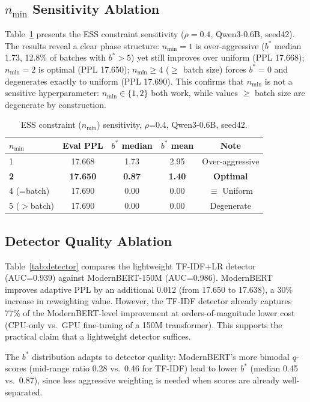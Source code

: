 \documentclass[11pt]{article}
\begin{document}
\subsection{$n_{\min}$ Sensitivity Ablation}
\label{sec:nmin_ablation}

Table~\ref{tab:nmin} presents the ESS constraint sensitivity ($\rho=0.4$, Qwen3-0.6B, seed42). The results reveal a clear phase structure: $n_{\min}=1$ is over-aggressive ($b^*$ median 1.73, 12.8\% of batches with $b^*>5$) yet still improves over uniform (PPL 17.668); $n_{\min}=2$ is optimal (PPL 17.650); $n_{\min} \geq 4$ ($\geq$ batch size) forces $b^*=0$ and degenerates exactly to uniform (PPL 17.690). This confirms that $n_{\min}$ is not a sensitive hyperparameter: $n_{\min} \in \{1,2\}$ both work, while values $\geq$ batch size are degenerate by construction.

\begin{table}[t]
\centering
\caption{ESS constraint ($n_{\min}$) sensitivity, $\rho$=0.4, Qwen3-0.6B, seed42.}
\label{tab:nmin}
\small
\begin{tabular}{l cccc}
\toprule
$n_{\min}$ & Eval PPL & $b^*$ median & $b^*$ mean & Note \\
\midrule
1 & 17.668 & 1.73 & 2.95 & Over-aggressive \\
\textbf{2} & \textbf{17.650} & \textbf{0.87} & \textbf{1.40} & \textbf{Optimal} \\
4 (=batch) & 17.690 & 0.00 & 0.00 & $\equiv$ Uniform \\
5 ($>$batch) & 17.690 & 0.00 & 0.00 & Degenerate \\
\bottomrule
\end{tabular}
\end{table}

\subsection{Detector Quality Ablation}
\label{sec:detector}

Table~\ref{tab:detector} compares the lightweight TF-IDF+LR detector (AUC=0.939) against ModernBERT-150M (AUC=0.986). ModernBERT improves adaptive PPL by an additional 0.012 (from 17.650 to 17.638), a 30\% increase in reweighting value. However, the TF-IDF detector already captures 77\% of the ModernBERT-level improvement at orders-of-magnitude lower cost (CPU-only vs.\ GPU fine-tuning of a 150M transformer). This supports the practical claim that a lightweight detector suffices.

The $b^*$ distribution adapts to detector quality: ModernBERT's more bimodal $q$-scores (mid-range ratio 0.28 vs.\ 0.46 for TF-IDF) lead to lower $b^*$ (median 0.45 vs.\ 0.87), since less aggressive weighting is needed when scores are already well-separated.
\end{document}
